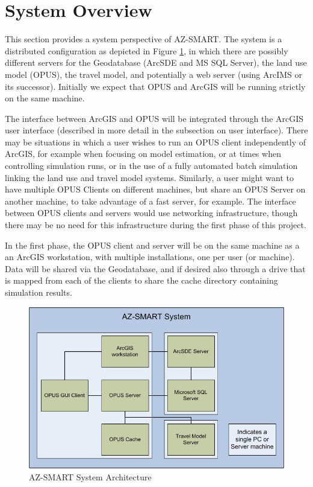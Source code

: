 \section{System Overview}
This section provides a system perspective of AZ-SMART.  The system is a distributed configuration as depicted in Figure \ref{figSystem}, in which there are possibly different servers for the Geodatabase (ArcSDE and MS SQL Server), the land use model (OPUS), the travel model, and potentially a web server (using ArcIMS or its successor).  Initially we expect that OPUS and ArcGIS will be running strictly on the same machine. 

The interface between ArcGIS and OPUS will be integrated through the ArcGIS user interface (described in more detail in the subsection on user interface).  There may be situations in which a user wishes to run an OPUS client independently of ArcGIS, for example when focusing on model estimation, or at times when controlling simulation runs, or in the use of a fully automated batch simulation linking the land use and travel model systems.  Similarly, a user might want to have multiple OPUS Clients on different machines, but share an OPUS Server on another machine, to take advantage of a fast server, for example.  The interface between OPUS clients and servers would use networking infrastructure, though there may be no need for this infrastructure during the first phase of this project.  

In the first phase, the OPUS client and server will be on the same machine as a an ArcGIS workstation, with multiple installations, one per user (or machine).  Data will be shared via the Geodatabase, and if desired also through a drive that is mapped from each of the clients to share the cache directory containing simulation results.

\begin{figure}[h]
\begin{center}
\includegraphics[scale=0.6]{figures/AZ-SMART_system_diagram.png}
\caption{AZ-SMART System Architecture}
\label{figSystem}
\end{center}
\end{figure}

